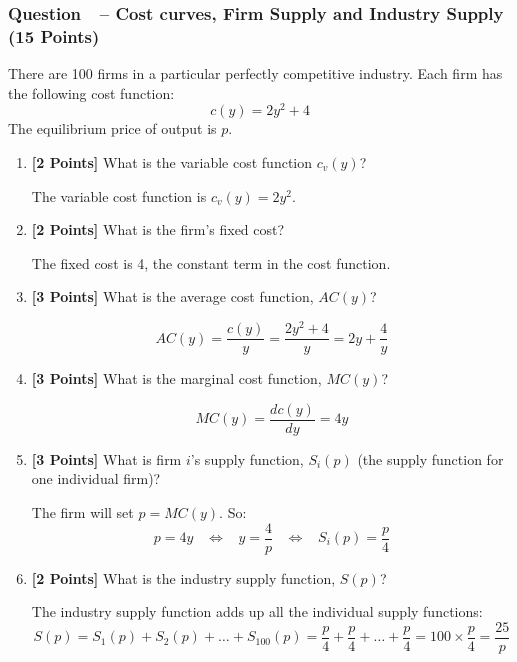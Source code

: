 \documentclass[10pt]{article}
\newcounter{question}[section]
\newcommand{\question}[1]{\refstepcounter{question}
  \subsubsection*{Question~\thequestion~-- #1}}
\newenvironment{subquestions}{
  \begin{enumerate}[label=(\roman*)]}{\end{enumerate}}
\begin{document}
\question{Cost curves, Firm Supply and Industry Supply (15 Points)}
There are 100 firms in a particular perfectly competitive industry. Each firm
has the following cost function:
\[
  c\left( y \right) = 2y^2 + 4
\]
The equilibrium price of output is $p$.
\begin{subquestions}
  \item \textbf{[2 Points]} What is the variable cost function $c_v\left( y
    \right)$?

    \textcolor{solution-color}{
    The variable cost function is $c_v\left( y \right)=2y^2$.
  }

  \item \textbf{[2 Points]}  What is the firm's fixed cost?

  \textcolor{solution-color}{
    The fixed cost is 4, the constant term in the cost function.
  }

  \item \textbf{[3 Points]}  What is the average cost function, $AC\left( y
    \right)$?

    \textcolor{solution-color}{
    \[
      AC\left( y \right)=\frac{c\left( y \right)}{y} = \frac{2y^2+4}{y} = 2y +
      \frac{4}{y}
    \]
  }

  \item \textbf{[3 Points]}  What is the marginal cost function, $MC\left( y
    \right)$?

    \textcolor{solution-color}{
    \[
      MC\left( y \right)=\frac{dc\left( y \right)}{dy}=4y
    \]
  }

  \item \textbf{[3 Points]}  What is firm $i$'s supply function, $S_i\left( p
    \right)$ (the supply function for one individual firm)?

  \textcolor{solution-color}{
    The firm will set $p=MC\left( y \right)$. So:
    \[
      p=4y \;\;\; \Longleftrightarrow \;\;\; y=\frac{4}{p}
      \;\;\; \Longleftrightarrow \;\;\; S_i\left( p
      \right)=\frac{p}{4}
    \]
  }

  \item \textbf{[2 Points]}  What is the industry supply function, $S\left( p
    \right)$?

  \textcolor{solution-color}{
    The industry supply function adds up all the individual supply functions:
    \[
      S\left( p \right)=S_1\left( p \right)+S_2\left( p
      \right)+\dots+S_{100}\left( p \right)=\frac{p}{4} +
      \frac{p}{4}+\dots+\frac{p}{4} = 100 \times \frac{p}{4}=\frac{25}{p}
    \]
  }
\end{subquestions}
\end{document}
